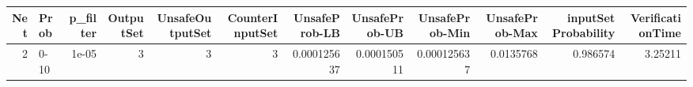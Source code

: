 \begin{tabular}{rlrrrrrrrrrr}
\hline
   Net & Prob   &   p\_filter &   OutputSet &   UnsafeOutputSet &   CounterInputSet &   UnsafeProb-LB &   UnsafeProb-UB &   UnsafeProb-Min &   UnsafeProb-Max &   inputSet Probability &   VerificationTime \\
\hline
     2 & 0-10   &      1e-05 &           3 &                 3 &                 3 &     0.000125637 &     0.000150511 &      0.000125637 &        0.0135768 &               0.986574 &            3.25211 \\
\hline
\end{tabular}
